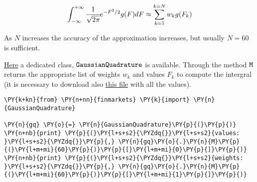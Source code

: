 \[\int_{-\infty}^{+\infty}\cfrac{1}{\sqrt{2\pi}}e^{-F^{2}/2}g(F)dF\approx\sum_{k=1}^{k=N}w_k g(F_k)\]

As \(N\) increases the accuracy of the approximation increases, but usually
\(N=60\) is sufficient.

\href{https://drive.google.com/file/d/1Ic20cgVx4dpDG4W_pIHR4EXq9ens1G-H/view?usp=sharing}{Here} a dedicated class, \(\tt{GaussianQuadrature}\) is
available. Through the method \(\tt{M}\) returns the appropriate list of
weights \(w_k\) and values \(F_k\) to compute the intergral (it is
necessary to download also \href{https://drive.google.com/file/d/1zpQ0ubbEzniJb9usMWeeMCc0DSc2MGsC/view?usp=sharing}{this file} with all the values).

\begin{tcolorbox}[breakable, size=fbox, boxrule=1pt, pad at break*=1mm,colback=cellbackground, colframe=cellborder]
\begin{Verbatim}[commandchars=\\\{\}]
\PY{k+kn}{from} \PY{n+nn}{finmarkets} \PY{k}{import} \PY{n}{GaussianQuadrature}
	
\PY{n}{gq} \PY{o}{=} \PY{n}{GaussianQuadrature}\PY{p}{(}\PY{p}{)}
\PY{n+nb}{print} \PY{p}{(}\PY{l+s+s2}{\PYZdq{}}\PY{l+s+s2}{values: }\PY{l+s+s2}{\PYZdq{}}\PY{p}{,} \PY{n}{gq}\PY{o}{.}\PY{n}{M}\PY{p}{(}\PY{l+m+mi}{60}\PY{p}{)}\PY{p}{[}\PY{l+m+mi}{0}\PY{p}{]}\PY{p}{)}
\PY{n+nb}{print} \PY{p}{(}\PY{l+s+s2}{\PYZdq{}}\PY{l+s+s2}{weights: }\PY{l+s+s2}{\PYZdq{}}\PY{p}{,} \PY{n}{gq}\PY{o}{.}\PY{n}{M}\PY{p}{(}\PY{l+m+mi}{60}\PY{p}{)}\PY{p}{[}\PY{l+m+mi}{1}\PY{p}{]}\PY{p}{)}


\end{Verbatim}
\end{tcolorbox}
